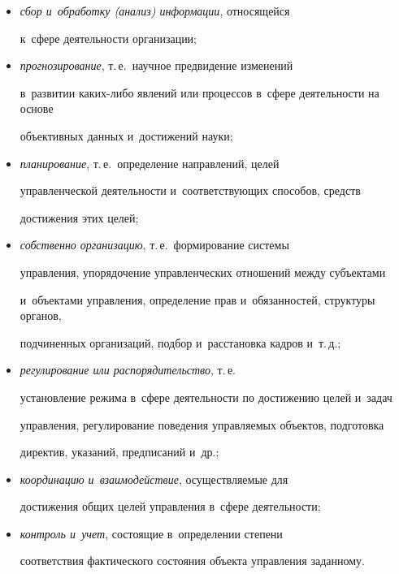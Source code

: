      \begin{itemize}

     \item  \textit{сбор и~обработку (анализ) информации}, относящейся 

     к~сфере деятельности организации; 

     \item  \textit{прогнозирование}, т.\,е.\ научное предвидение изменений 

     в~развитии ка\-ких-ли\-бо явлений или процессов в~сфере деятельности на основе 

объективных данных и~достижений науки; 

     \item \textit{планирование}, т.\,е.\ определение направлений, целей 

управленческой деятельности и~соответствующих способов, средств 

достижения этих целей; 

      \item \textit{собственно организацию}, т.\,е.\ формирование системы 

управления, упорядочение управленческих отношений между субъектами 

и~объектами управления, определение прав и~обязанностей, структуры органов, 

подчиненных организаций, подбор и~расстановка кадров и~т.\,д.; 

     \item  \textit{регулирование или распорядительство}, т.\,е.\ 

установление режима в~сфере деятельности по достижению целей и~задач 

управления, регулирование поведения управляемых объектов, подготовка 

директив, указаний, предписаний и~др.; 

     \item \textit{координацию и~взаимодействие}, осуществляемые для 

достижения общих целей управления в~сфере деятельности; 

     \item \textit{контроль и~учет}, состоящие в~определении степени 

соответствия фактического состояния объекта управления заданному.

     \end{itemize}

     

